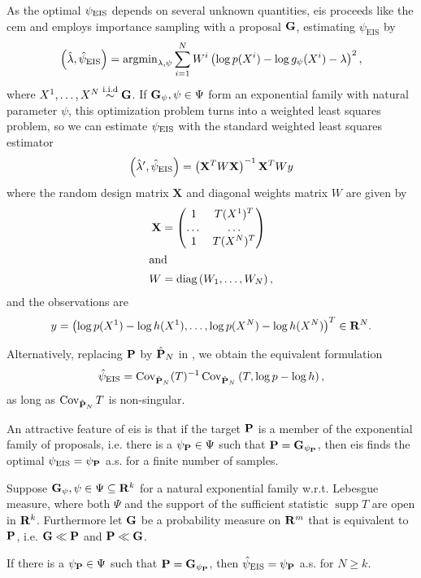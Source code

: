 As the optimal $\peis$ depends on several unknown quantities, \gls{eis} proceeds like the \gls{cem} and employs importance sampling with a proposal $\G$, estimating $\psi_{\text{EIS}}$ by
$$
\left(\hat \lambda,\hat \psi_{\text{EIS}}\right) = \argmin_{\lambda,\psi} \sum_{i=1}^N W^{i} \left( \log p(X^{i}) - \log g_{\psi}(X^{i}) - \lambda \right)^{2},
$$
where $X^{1}, \dots, X^{N} \iid \G$. 
If $\G_{\psi}, \psi \in \Psi$ form an exponential family with natural parameter $\psi$, this optimization problem turns into a weighted least squares problem, so we can estimate $\peis$ with the standard weighted least squares estimator
$$
\left( \hat\lambda', \hpeis \right) = \left(\mathbf X^{T}W\mathbf X\right)^{-1}\mathbf X^{T}W y%
$$
where the random design matrix $\mathbf X$ and diagonal weights matrix $W$ are given by
\begin{align*}
\mathbf X &= \begin{pmatrix}
    1 & T(X^{1})^{T} \\
    \dots&\dots\\
    1 & T(X^{N})^{T} \\
\end{pmatrix}\\
\intertext{and}
W &= \text{diag} \left( W_{1}, \dots, W_{N} \right),
\end{align*}
and the observations are 
\begin{align*}
y = \left( \log p(X^{1}) - \log h(X^{1}), \dots, \log p(X^{N}) - \log h(X^{N}) \right)^{T} \in \R^{N}.
\end{align*}

Alternatively, replacing $\P$ by $\hat\P_{N}$ in , we obtain the equivalent formulation
\begin{align}
    \label{eq:hpeis-cov}
    \hpeis = \cov_{\hat\P_{N}} (T)^{-1} \cov_{\hat \P_{N}} \left( T, \log p - \log h \right),
\end{align}
as long as $\cov_{\hat \P_{N}} T$ is non-singular.

An attractive feature of \gls{eis} is that if the target $\P$ is a member of the exponential family of proposals, i.e. there is a $\psi_{\P}\in\Psi$ such that $\P = \G_{\psi_{\P}}$, then \gls{eis} finds the optimal $\peis = \psi_{\P}$ a.s. for a finite number of samples.

\begin{proposition}
    \label{prop:eis-finite-sample}
    Suppose $\G_{\psi}, \psi \in \Psi \subseteq \R^{k}$ for a natural exponential family w.r.t. Lebesgue measure, where both $\Psi$ and the support of the sufficient statistic $\operatorname{supp} T$ are open in $\R^{k}$. 
    Furthermore let $\G$ be a probability measure on $\R^{m}$ that is equivalent to $\P$, i.e. $\G \ll \P$ and $\P \ll \G$. 

    If there is a $\psi_{\P} \in \Psi$ such that $\P = \G_{\psi_{\P}}$, then $\hpeis = \psi_{\P}$ a.s. for $N \geq k$. 
\end{proposition}

